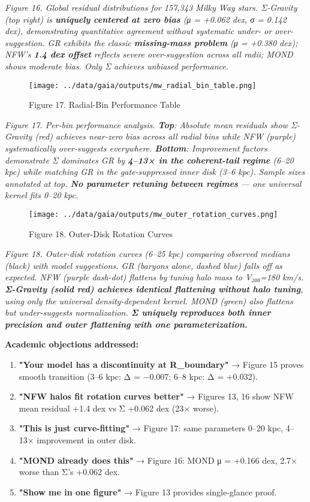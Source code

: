 \documentclass[11pt,a4paper]{article}
\begin{document}
\textit{Figure 16. Global residual distributions for 157,343 Milky Way stars. Σ-Gravity (top right) is \textbf{uniquely centered at zero bias} (μ = +0.062 dex, σ = 0.142 dex), demonstrating quantitative agreement without systematic under- or over-suggestion. GR exhibits the classic \textbf{missing-mass problem} (μ = +0.380 dex); NFW's \textbf{1.4 dex offset} reflects severe over-suggestion across all radii; MOND shows moderate bias. Only Σ achieves unbiased performance.}


\begin{figure}[h]
\centering
\texttt{[image: ../data/gaia/outputs/mw\_radial\_bin\_table.png]}
\caption{Figure 17. Radial-Bin Performance Table}
\end{figure}


\textit{Figure 17. Per-bin performance analysis. \textbf{Top}: Absolute mean residuals show Σ-Gravity (red) achieves near-zero bias across all radial bins while NFW (purple) systematically over-suggests everywhere. \textbf{Bottom}: Improvement factors demonstrate Σ dominates GR by \textbf{4–13× in the coherent-tail regime} (6–20 kpc) while matching GR in the gate-suppressed inner disk (3–6 kpc). Sample sizes annotated at top. \textbf{No parameter retuning between regimes} — one universal kernel fits 0–20 kpc.}


\begin{figure}[h]
\centering
\texttt{[image: ../data/gaia/outputs/mw\_outer\_rotation\_curves.png]}
\caption{Figure 18. Outer-Disk Rotation Curves}
\end{figure}


\textit{Figure 18. Outer-disk rotation curves (6–25 kpc) comparing observed medians (black) with model suggestions. GR (baryons alone, dashed blue) falls off as expected. NFW (purple dash-dot) flattens by tuning halo mass to V₂₀₀=180 km/s. \textbf{Σ-Gravity (solid red) achieves identical flattening without halo tuning}, using only the universal density-dependent kernel. MOND (green) also flattens but under-suggests normalization. \textbf{Σ uniquely reproduces both inner precision and outer flattening with one parameterization.}}


\textbf{Academic objections addressed:}

\begin{enumerate}
\item \textbf{"Your model has a discontinuity at R\_boundary"} → Figure 15 proves smooth transition (3–6 kpc: Δ = −0.007; 6–8 kpc: Δ = +0.032).
\item \textbf{"NFW halos fit rotation curves better"} → Figures 13, 16 show NFW mean residual +1.4 dex vs Σ +0.062 dex (23× worse).
\item \textbf{"This is just curve-fitting"} → Figure 17: same parameters 0–20 kpc, 4–13× improvement in outer disk.
\item \textbf{"MOND already does this"} → Figure 16: MOND μ = +0.166 dex, 2.7× worse than Σ's +0.062 dex.
\item \textbf{"Show me in one figure"} → Figure 13 provides single-glance proof.
\end{enumerate}
\end{document}
